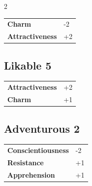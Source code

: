 \begin{multicols}{2}
\begin{tcolorbox}
\begin{tabular}{@{}ll@{}}
    \textbf{Charm} & -2\\
    \textbf{Attractiveness} & +2\\
\end{tabular}


\end{tcolorbox}

\begin{tcolorbox}
    \subsection*{Likable \hfill \small{5 }}
    \tcblower




\begin{tabular}{@{}ll@{}}
    \textbf{Attractiveness} & +2\\
    \textbf{Charm} & +1\\
\end{tabular}


\end{tcolorbox}

\begin{tcolorbox}
    \subsection*{Adventurous \hfill \small{2 }}
    \tcblower




\begin{tabular}{@{}ll@{}}
    \textbf{Conscientiousness} & -2\\
    \textbf{Resistance} & +1\\
    \textbf{Apprehension} & +1\\
\end{tabular}


\end{tcolorbox}


\end{multicols}
